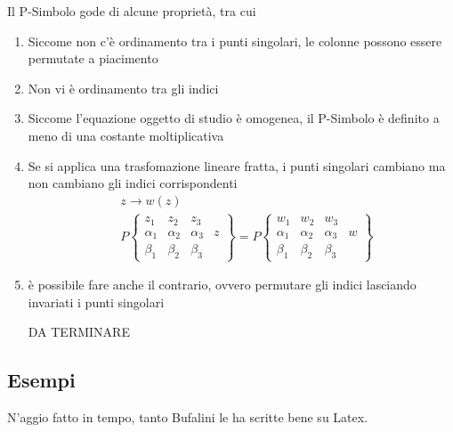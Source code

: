 Il P-Simbolo gode di alcune proprietà, tra cui
\begin{enumerate}
	\item Siccome non c'è ordinamento tra i punti singolari, le colonne possono essere permutate a piacimento
	\item Non vi è ordinamento tra gli indici
	\item Siccome l'equazione oggetto di studio è omogenea, il P-Simbolo è definito a meno di una costante moltiplicativa
	\item Se si applica una trasfomazione lineare fratta, i punti singolari cambiano ma non cambiano gli indici corrispondenti
	\begin{align}
		&z \to w(z)\\
		&P\left\{\begin{matrix}
			z_1 & z_2 & z_3 & \\
			\alpha_1 & \alpha_2 & \alpha_3& z\\
			\beta_1 & \beta_2 & \beta_3 & 
		\end{matrix}\right\} =
		P\left\{\begin{matrix}
			w_1 & w_2 & w_3 & \\
			\alpha_1 & \alpha_2 & \alpha_3& w\\
			\beta_1 & \beta_2 & \beta_3 & 
		\end{matrix}\right\}
	\end{align}
	\item è possibile fare anche il contrario, ovvero permutare gli indici lasciando invariati i punti singolari
	
	DA TERMINARE
\end{enumerate}



\newpage
{}


\newpage
\subsection{Esempi}
N'aggio fatto in tempo, tanto Bufalini le ha scritte bene su Latex.